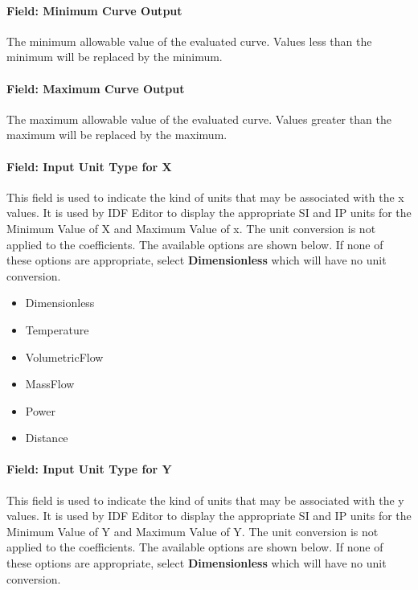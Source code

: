 \paragraph{Field: Minimum Curve Output}\label{field-minimum-curve-output-9}

The minimum allowable value of the evaluated curve. Values less than the minimum will be replaced by the minimum.

\paragraph{Field: Maximum Curve Output}\label{field-maximum-curve-output-8}

The maximum allowable value of the evaluated curve. Values greater than the maximum will be replaced by the maximum.

\paragraph{Field: Input Unit Type for X}\label{field-input-unit-type-for-x-10}

This field is used to indicate the kind of units that may be associated with the x values. It is used by IDF Editor to display the appropriate SI and IP units for the Minimum Value of X and Maximum Value of x. The unit conversion is not applied to the coefficients. The available options are shown below. If none of these options are appropriate, select \textbf{Dimensionless} which will have no unit conversion.

\begin{itemize}
\item
  Dimensionless
\item
  Temperature
\item
  VolumetricFlow
\item
  MassFlow
\item
  Power
\item
  Distance
\end{itemize}

\paragraph{Field: Input Unit Type for Y}\label{field-input-unit-type-for-y-5}

This field is used to indicate the kind of units that may be associated with the y values. It is used by IDF Editor to display the appropriate SI and IP units for the Minimum Value of Y and Maximum Value of Y. The unit conversion is not applied to the coefficients. The available options are shown below. If none of these options are appropriate, select \textbf{Dimensionless} which will have no unit conversion.

